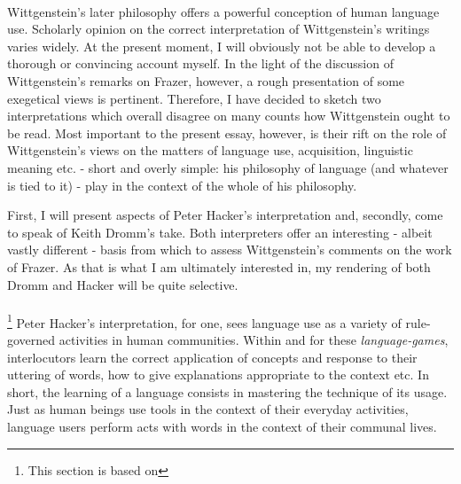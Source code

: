\documentclass{article}
\begin{document}
\paragraph{ } Wittgenstein's later philosophy offers a powerful conception of human language use. Scholarly opinion on the correct interpretation of Wittgenstein's writings varies widely. At the present moment, I will obviously not be able to develop a thorough or convincing account myself. In the light of the discussion of Wittgenstein's remarks on Frazer, however, a rough presentation of some exegetical views is pertinent. Therefore, I have decided to sketch two interpretations which overall disagree on many counts how Wittgenstein ought to be read. Most important to the present essay, however, is their rift on the role of Wittgenstein's views on the matters of language use, acquisition, linguistic meaning etc. - short and overly simple: his philosophy of language (and whatever is tied to it) - play in the context of the whole of his philosophy.

First, I will present aspects of Peter Hacker's interpretation and, secondly, come to speak of Keith Dromm's take. Both interpreters offer an interesting - albeit vastly different - basis from which to assess Wittgenstein's comments on the work of Frazer. As that is what I am ultimately interested in, my rendering of both Dromm and Hacker will be quite selective.

\paragraph{ }\footnote{This section is based on }%
Peter Hacker's interpretation, for one, sees language use as a variety of rule-governed activities in human communities. Within and for these \textit{language-games}, interlocutors learn the correct application of concepts and response to their uttering of words, how to give explanations appropriate to the context etc. In short, the learning of a language consists in mastering the technique of its usage.
Just as human beings use tools in the context of their everyday activities, language users perform acts with words in the context of their communal lives. 
\end{document}
